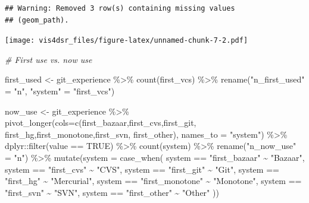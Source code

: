 \documentclass[
]{krantz}
\makeatletter
\newenvironment{Shaded}{\begin{snugshade}}{\end{snugshade}}
\newcommand{\AttributeTok}[1]{\textcolor[rgb]{0.61,0.61,0.61}{#1}}
\newcommand{\CommentTok}[1]{\textcolor[rgb]{0.37,0.37,0.37}{\textit{#1}}}
\newcommand{\ConstantTok}[1]{\textcolor[rgb]{0,0,0}{#1}}
\newcommand{\FunctionTok}[1]{\textcolor[rgb]{0,0,0}{#1}}
\newcommand{\NormalTok}[1]{#1}
\newcommand{\OtherTok}[1]{\textcolor[rgb]{0.37,0.37,0.37}{#1}}
\newcommand{\SpecialCharTok}[1]{\textcolor[rgb]{0,0,0}{#1}}
\newcommand{\StringTok}[1]{\textcolor[rgb]{0.5,0.5,0.5}{#1}}
\newenvironment{kframe}{%
\medskip{}
\setlength{\fboxsep}{.8em}
 \def\at@end@of@kframe{}%
 \ifinner\ifhmode%
  \def\at@end@of@kframe{\end{minipage}}%
  \begin{minipage}{\columnwidth}%
 \fi\fi%
 \def\FrameCommand##1{\hskip\@totalleftmargin \hskip-\fboxsep
 \colorbox{shadecolor}{##1}\hskip-\fboxsep
     \hskip-\linewidth \hskip-\@totalleftmargin \hskip\columnwidth}%
 \MakeFramed {\advance\hsize-\width
   \@totalleftmargin\z@ \linewidth\hsize
   \@setminipage}}%
 {\par\unskip\endMakeFramed%
 \at@end@of@kframe}
\renewenvironment{Shaded}{\begin{kframe}}{\end{kframe}}
\makeatother
\begin{document}
\begin{verbatim}
## Warning: Removed 3 row(s) containing missing values
## (geom_path).
\end{verbatim}

\texttt{[image: vis4dsr\_files/figure-latex/unnamed-chunk-7-2.pdf]}

\begin{Shaded}
\begin{Highlighting}[]
\CommentTok{\# First use vs. now use}

\NormalTok{first\_used }\OtherTok{\textless{}{-}}\NormalTok{ git\_experience }\SpecialCharTok{\%\textgreater{}\%} 
  \FunctionTok{count}\NormalTok{(first\_vcs) }\SpecialCharTok{\%\textgreater{}\%}
  \FunctionTok{rename}\NormalTok{(}\StringTok{"n\_first\_used"} \OtherTok{=} \StringTok{"n"}\NormalTok{, }\StringTok{"system"} \OtherTok{=} \StringTok{"first\_vcs"}\NormalTok{)}

\NormalTok{now\_use }\OtherTok{\textless{}{-}}\NormalTok{ git\_experience }\SpecialCharTok{\%\textgreater{}\%}
  \FunctionTok{pivot\_longer}\NormalTok{(}\AttributeTok{cols=}\FunctionTok{c}\NormalTok{(first\_bazaar,first\_cvs,first\_git,}
\NormalTok{                      first\_hg,first\_monotone,first\_svn, first\_other),}
               \AttributeTok{names\_to =} \StringTok{"system"}\NormalTok{) }\SpecialCharTok{\%\textgreater{}\%}
\NormalTok{  dplyr}\SpecialCharTok{::}\FunctionTok{filter}\NormalTok{(value }\SpecialCharTok{==} \ConstantTok{TRUE}\NormalTok{) }\SpecialCharTok{\%\textgreater{}\%}
  \FunctionTok{count}\NormalTok{(system) }\SpecialCharTok{\%\textgreater{}\%}
  \FunctionTok{rename}\NormalTok{(}\StringTok{"n\_now\_use"} \OtherTok{=} \StringTok{"n"}\NormalTok{) }\SpecialCharTok{\%\textgreater{}\%}
  \FunctionTok{mutate}\NormalTok{(}\AttributeTok{system =} \FunctionTok{case\_when}\NormalTok{(}
\NormalTok{    system }\SpecialCharTok{==} \StringTok{"first\_bazaar"} \SpecialCharTok{\textasciitilde{}} \StringTok{"Bazaar"}\NormalTok{,}
\NormalTok{    system }\SpecialCharTok{==} \StringTok{"first\_cvs"} \SpecialCharTok{\textasciitilde{}} \StringTok{"CVS"}\NormalTok{,}
\NormalTok{    system }\SpecialCharTok{==}  \StringTok{"first\_git"} \SpecialCharTok{\textasciitilde{}} \StringTok{"Git"}\NormalTok{,}
\NormalTok{    system }\SpecialCharTok{==}  \StringTok{"first\_hg"} \SpecialCharTok{\textasciitilde{}} \StringTok{"Mercurial"}\NormalTok{,}
\NormalTok{    system }\SpecialCharTok{==}  \StringTok{"first\_monotone"} \SpecialCharTok{\textasciitilde{}} \StringTok{"Monotone"}\NormalTok{,}
\NormalTok{    system }\SpecialCharTok{==}  \StringTok{"first\_svn"} \SpecialCharTok{\textasciitilde{}} \StringTok{"SVN"}\NormalTok{, }
\NormalTok{    system }\SpecialCharTok{==}  \StringTok{"first\_other"} \SpecialCharTok{\textasciitilde{}} \StringTok{"Other"}
\NormalTok{  ))}


\end{Highlighting}
\end{Shaded}
\end{document}
